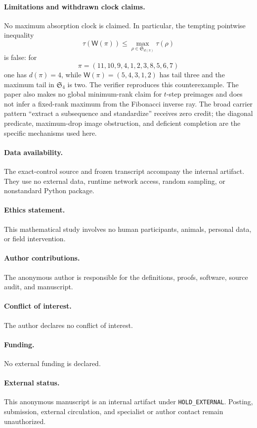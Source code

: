 \documentclass[a4paper,10pt]{amsart}
\theoremstyle{remark}
\newcommand{\Sym}{\mathfrak S}
\newcommand{\WEX}{\mathsf W}
\begin{document}
\paragraph{Limitations and withdrawn clock claims.}
No maximum absorption clock is claimed.  In particular, the tempting
pointwise inequality
\[
 \tau(\WEX(\pi))\le
 \max_{\rho\in\Sym_{d(\pi)}}\tau(\rho)
\]
is false: for
\[
 \pi=(11,10,9,4,1,2,3,8,5,6,7)
\]
one has $d(\pi)=4$, while
$\WEX(\pi)=(5,4,3,1,2)$ has tail three and the maximum tail in $\Sym_4$ is
two.  The verifier reproduces this counterexample.  The paper also makes no
global minimum-rank claim for $t$-step preimages and does not infer a
fixed-rank maximum from the Fibonacci inverse ray.  The broad carrier pattern
``extract a subsequence and standardize'' receives zero credit; the diagonal
predicate, maximum-drop image obstruction, and deficient completion are the
specific mechanisms used here.

\paragraph{Data availability.}
The exact-control source and frozen transcript accompany the internal
artifact.  They use no external data, runtime network access, random sampling,
or nonstandard Python package.

\paragraph{Ethics statement.}
This mathematical study involves no human participants, animals, personal
data, or field intervention.

\paragraph{Author contributions.}
The anonymous author is responsible for the definitions, proofs, software,
source audit, and manuscript.

\paragraph{Conflict of interest.}
The author declares no conflict of interest.

\paragraph{Funding.}
No external funding is declared.

\paragraph{External status.}
This anonymous manuscript is an internal artifact under
\texttt{HOLD\_EXTERNAL}.  Posting, submission, external circulation, and
specialist or author contact remain unauthorized.



\end{document}
